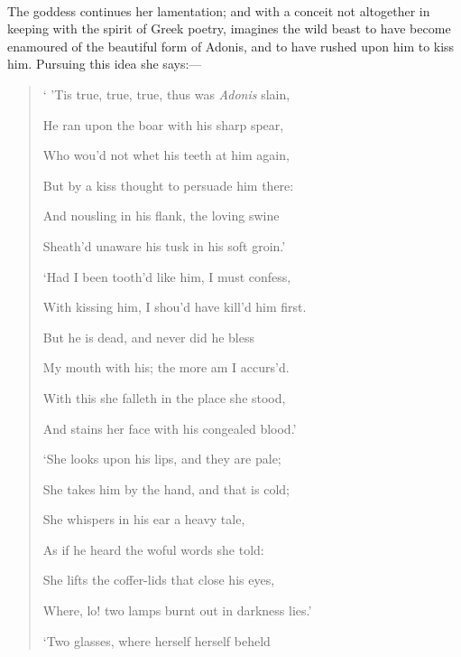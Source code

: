\documentclass[a4paper, 11pt, oneside, polutonikogreek, english]{article}
\begin{document}
\paragraph{}
The goddess continues her lamentation; and with a conceit not altogether in keeping with the spirit of Greek poetry, imagines the wild beast to have become enamoured of the beautiful form of Adonis, and to have rushed upon him to kiss him. Pursuing this idea she says:---
\begin{quotation}
` 'Tis true, true, true, thus was \emph{Adonis} slain,

He ran upon the boar with his sharp spear,

Who wou'd not whet his teeth at him again,

But by a kiss thought to persuade him there:

\hspace*{15mm}And nousling in his flank, the loving swine

\hspace*{15mm}Sheath'd unaware his tusk in his soft groin.'

\bigskip

`Had I been tooth'd like him, I must confess,

With kissing him, I shou'd have kill'd him first.

But he is dead, and never did he bless

My mouth with his; the more am I accurs'd.

\hspace*{15mm}With this she falleth in the place she stood,

\hspace*{15mm}And stains her face with his congealed blood.'

\bigskip

`She looks upon his lips, and they are pale;

She takes him by the hand, and that is cold;

She whispers in his ear a heavy tale,

As if he heard the woful words she told:

\hspace*{15mm}She lifts the coffer-lids that close his eyes,

\hspace*{15mm}Where, lo! two lamps burnt out in darkness lies.'

\bigskip

`Two glasses, where herself herself beheld


\end{quotation}
\end{document}
